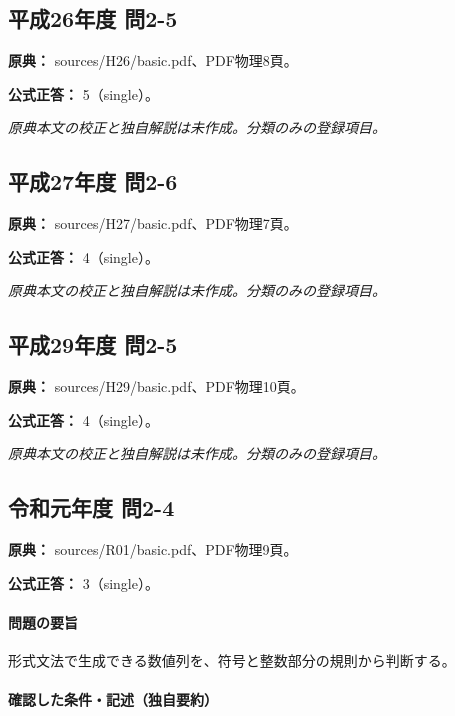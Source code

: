 \subsection{平成26年度 問2-5}
\label{q:h26-reg-basic-2-5}

\noindent\textbf{原典：} sources/H26/basic.pdf、PDF物理8頁。

\textbf{公式正答：} 5（single）。

\par\textit{原典本文の校正と独自解説は未作成。分類のみの登録項目。}

\subsection{平成27年度 問2-6}
\label{q:h27-reg-basic-2-6}

\noindent\textbf{原典：} sources/H27/basic.pdf、PDF物理7頁。

\textbf{公式正答：} 4（single）。

\par\textit{原典本文の校正と独自解説は未作成。分類のみの登録項目。}

\subsection{平成29年度 問2-5}
\label{q:h29-reg-basic-2-5}

\noindent\textbf{原典：} sources/H29/basic.pdf、PDF物理10頁。

\textbf{公式正答：} 4（single）。

\par\textit{原典本文の校正と独自解説は未作成。分類のみの登録項目。}

\subsection{令和元年度 問2-4}
\label{q:r01-reg-basic-2-4}

\noindent\textbf{原典：} sources/R01/basic.pdf、PDF物理9頁。

\textbf{公式正答：} 3（single）。

\paragraph{問題の要旨} 形式文法で生成できる数値列を、符号と整数部分の規則から判断する。

\paragraph{確認した条件・記述（独自要約）}\mbox{}\par

